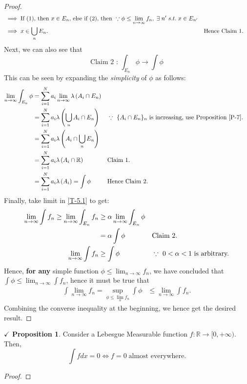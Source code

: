 \documentclass{article}
\theoremstyle{definition}
\theoremstyle{remark}
\theoremstyle{definition}
\theoremstyle{definition}
\newtheorem{proposition}{$\checkmark$ Proposition}
\theoremstyle{definition}
\newcommand{\intrs}{\cap}
\newcommand{\bunion}{\bigcup}
\newcommand{\R}{\mathbb{R}}
\newcommand{\lm}[1]{\lambda\left (#1\right )}
\begin{document}
\begin{proof}
\begin{align*}
		&\implies \text{If $ (1) $, then $ x\in E_n $, else if $ (2) $, then }\because \phi \le \lim_{n\to \infty}f_n, \;\exists \; n^{\prime} \;s.t.\; x\in E_{n^{\prime}}\\
		&\implies x\in \bunion_{n} E_n. && \text{Hence Claim 1.}
	\end{align*}
Next, we can also see that
\[\text{Claim 2 : }\int_{E_n}\phi \longrightarrow \int \phi\]
This can be seen by expanding the \emph{simplicity} of $ \phi $ as follows:
\begin{align*}
\lim_{n\to \infty}	\int_{E_n} \phi &= \sum_{i=1}^{N} a_i\lim_{n\to \infty} \lm{A_i\intrs E_n}\\
	&= \sum_{i=1}^{N} a_i \lm{\bunion_{n} A_i \intrs E_n} &&\because \text{ $ \{A_i\intrs E_n\}_n $ is increasing, use Proposition \ref{P-7}.}\\
	&= \sum_{i=1}^{N} a_i \lm{A_i \intrs \bunion_n E_n}\\
	&= \sum_{i=1}^{N}a_i \lm{A_i \intrs \R} &&\text{Claim 1.}\\
	&= \sum_{i=1}^{N} a_i \lm{A_i} = \int \phi &&\text{Hence Claim 2.}
\end{align*}
Finally, take limit in \eqref{T-5.1} to get:
\begin{align*}
	\lim_{n\to \infty} \int f_n \ge \lim_{n\to \infty} \int_{E_n}f_n &\ge \alpha\lim_{n\to \infty} \int_{E_n} \phi &&\\
	&=\alpha \int \phi&&\text{Claim 2.}\\
	\lim_{n\to \infty} \int f_n &\ge \int \phi &&\because\text{ $ 0<\alpha <1 $ is arbitrary.}
\end{align*}
Hence, \textbf{for any} simple function $ \phi  \le \lim_{n\to \infty}f_n$, we have concluded that $ \int \phi \le \lim_{n\to \infty} \int f_n  $, hence it must be true that
\begin{align*}
	\int \lim_{n\to \infty} f_n = \sup_{\phi \le \lim_{n} f_n} \int \phi &\le \lim_{n\to \infty}\int f_n.
\end{align*}
Combining the converse inequality at the beginning, we hence get the desired result.
\end{proof}
\hrulefill
\begin{proposition}
	Consider a Lebesgue Measurable function $ f : \R\to [0,+\infty) $. Then,
	\[ \int f dx = 0 \mathbf{\iff} f = 0 \;\text{almost everywhere.} \]
\end{proposition}
\begin{proof}
	
\end{proof}
\hrulefill
\end{document}
